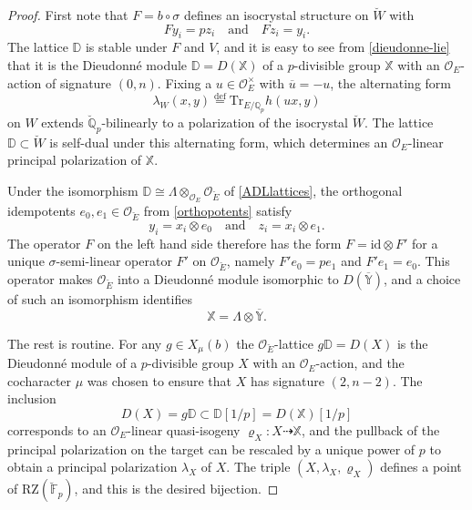 \documentclass[11pt]{alggeom}
\newcommand{\iso}{\cong}
\newcommand{\define}{\stackrel{\mathrm{def}}{=}}
\newcommand{\Q}{\mathbb Q}
\newcommand{\F}{\mathbb F}
\newcommand{\co}{\mathcal O}
\begin{document}
\begin{proof}
First note that $F=b\circ \sigma$  defines an isocrystal structure on $\breve{W}$ with  
\[
F y_i = p z_i \quad \mbox{and} \quad F z_i = y_i.
\]
  The lattice $\mathbb{D}$ is stable under $F$ and $V$, and it is easy to see from 
\eqref{dieudonne-lie} that it is the Dieudonn\'e module $\mathbb{D}=D(\mathbb{X})$ of a $p$-divisible group $\mathbb{X}$ with an $\co_E$-action of  signature $(0,n)$.  
Fixing a $u \in \co_E^\times$ with $\overline{u} = -u$, the alternating form 
\[
\lambda_W(x,y)\define \mathrm{Tr}_{E/\Q_p} h(ux,y)
\]
 on $W$ extends $\breve{\Q}_p$-bilinearly to a polarization of the isocrystal $\breve{W}$.
 The lattice $\mathbb{D} \subset \breve{W}$ is self-dual under this alternating form, which 
determines an $\co_E$-linear  principal polarization of $\mathbb{X}$.  


Under the isomorphism $\mathbb{D} \iso \Lambda \otimes_{\co_E} \co_{\breve{E}}$ of  \eqref{ADLlattices}, the 
 orthogonal idempotents $e_0,e_1 \in \co_{\breve{E}}$ from \eqref{orthopotents} satisfy
 \[
 y_i = x_i \otimes e_0 \quad \mbox{and} \quad z_i = x_i \otimes e_1.
 \]
The operator $F$ on the left hand side therefore has the form $F=\mathrm{id} \otimes F'$ for a  unique $\sigma$-semi-linear operator $F'$ on $\co_{\breve{E}}$, namely $F' e_0 = p e_1$ and $F' e_1=e_0$.
This operator makes $ \co_{\breve{E}}$ into a Dieudonn\'e module isomorphic to $D(\overline{\mathbb{Y}})$, and a choice of such an isomorphism identifies
\[
\mathbb{X} = \Lambda \otimes \overline{\mathbb{Y}} .
\]

The rest  is routine. 
For any $g\in X_\mu(b)$ the $\co_{\breve{E}}$-lattice $g\mathbb{D}=D(X)$ is  the Dieudonn\'e module of a $p$-divisible group $X$ with an $\co_E$-action, and the cocharacter  $\mu$ was chosen to ensure that $X$ has signature $(2,n-2)$. 
The inclusion 
\[
D(X)=g \mathbb{D}  \subset \mathbb{D} [1/p] = D(\mathbb{X}) [1/p]
\]
 corresponds to an $\co_E$-linear quasi-isogeny $\varrho_X: X \dashrightarrow \mathbb{X}$, and the pullback of the principal polarization on the target can be rescaled by a unique power of $p$ to obtain a principal polarization $\lambda_X$ of $X$.
The triple $(X,\lambda_X,\varrho_X)$ defines a point of $\mathrm{RZ}(\breve{\F}_p)$, and this is the desired bijection.
\end{proof}

 






\end{document}
